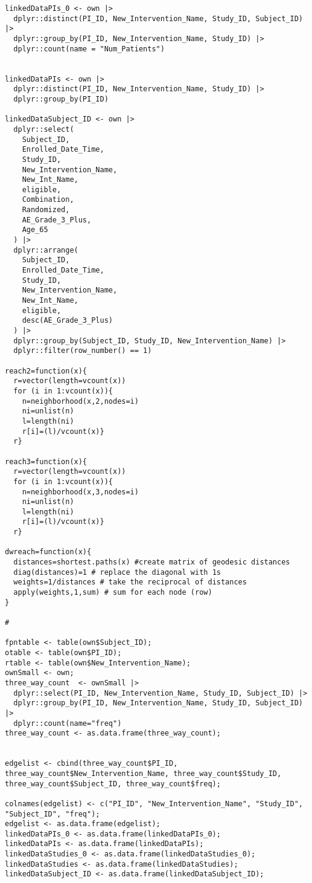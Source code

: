 \begin{verbatim}
linkedDataPIs_0 <- own |>
  dplyr::distinct(PI_ID, New_Intervention_Name, Study_ID, Subject_ID) |>
  dplyr::group_by(PI_ID, New_Intervention_Name, Study_ID) |>
  dplyr::count(name = "Num_Patients")


linkedDataPIs <- own |>
  dplyr::distinct(PI_ID, New_Intervention_Name, Study_ID) |>
  dplyr::group_by(PI_ID)

linkedDataSubject_ID <- own |>
  dplyr::select(
    Subject_ID,
    Enrolled_Date_Time,
    Study_ID,
    New_Intervention_Name,
    New_Int_Name,
    eligible,
    Combination,
    Randomized,
    AE_Grade_3_Plus,
    Age_65
  ) |>
  dplyr::arrange(
    Subject_ID,
    Enrolled_Date_Time,
    Study_ID,
    New_Intervention_Name,
    New_Int_Name,
    eligible,
    desc(AE_Grade_3_Plus)
  ) |>
  dplyr::group_by(Subject_ID, Study_ID, New_Intervention_Name) |>
  dplyr::filter(row_number() == 1)

reach2=function(x){
  r=vector(length=vcount(x))
  for (i in 1:vcount(x)){
    n=neighborhood(x,2,nodes=i)
    ni=unlist(n)
    l=length(ni)
    r[i]=(l)/vcount(x)}
  r}

reach3=function(x){
  r=vector(length=vcount(x))
  for (i in 1:vcount(x)){
    n=neighborhood(x,3,nodes=i)
    ni=unlist(n)
    l=length(ni)
    r[i]=(l)/vcount(x)}
  r}

dwreach=function(x){
  distances=shortest.paths(x) #create matrix of geodesic distances
  diag(distances)=1 # replace the diagonal with 1s
  weights=1/distances # take the reciprocal of distances
  apply(weights,1,sum) # sum for each node (row)
}

#

fpntable <- table(own$Subject_ID);
otable <- table(own$PI_ID);
rtable <- table(own$New_Intervention_Name);
ownSmall <- own;
three_way_count  <- ownSmall |>
  dplyr::select(PI_ID, New_Intervention_Name, Study_ID, Subject_ID) |>
  dplyr::group_by(PI_ID, New_Intervention_Name, Study_ID, Subject_ID) |>
  dplyr::count(name="freq")
three_way_count <- as.data.frame(three_way_count);


edgelist <- cbind(three_way_count$PI_ID, three_way_count$New_Intervention_Name, three_way_count$Study_ID, three_way_count$Subject_ID, three_way_count$freq);

colnames(edgelist) <- c("PI_ID", "New_Intervention_Name", "Study_ID", "Subject_ID", "freq");
edgelist <- as.data.frame(edgelist);
linkedDataPIs_0 <- as.data.frame(linkedDataPIs_0);
linkedDataPIs <- as.data.frame(linkedDataPIs);
linkedDataStudies_0 <- as.data.frame(linkedDataStudies_0);
linkedDataStudies <- as.data.frame(linkedDataStudies);
linkedDataSubject_ID <- as.data.frame(linkedDataSubject_ID);


\end{verbatim}
